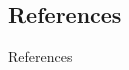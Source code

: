 \documentclass[pdf,aspectratio=169]{beamer}
\begin{document}
\subsection{References}
\begin{frame}[allowframebreaks]{References}
    \nocite{*}
    
    
\end{frame}
\end{document}
